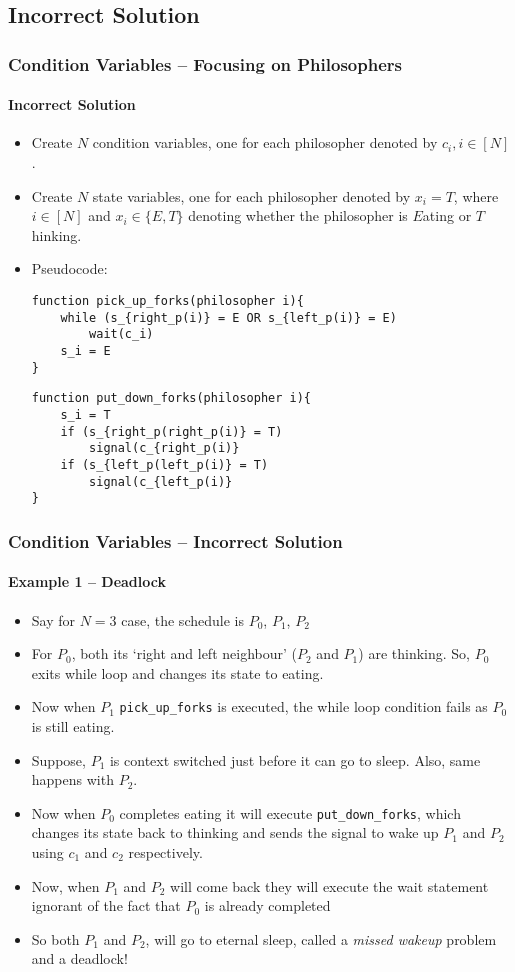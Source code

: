 \documentclass[aspectratio=169, handout, 10pt]{beamer}
\theoremstyle{example}
\begin{document}
\subsection{Incorrect Solution}
\begin{frame}[fragile]\frametitle{Condition Variables -- Focusing on Philosophers}\framesubtitle{Incorrect Solution}
  \small\begin{itemize}
  \pause\item Create $N$ condition variables, one for each philosopher denoted by $c_i, i \in [N]$.
  \pause\item Create $N$ state variables, one for each philosopher denoted by $x_i = T$, where $i \in [N]$ and $x_i \in \{E,T\}$ denoting whether the philosopher is $E$ating or $T$hinking.
  \pause\item Pseudocode:
\begin{Verbatim}[frame=single]
function pick_up_forks(philosopher i){
    while (s_{right_p(i)} = E OR s_{left_p(i)} = E)
        wait(c_i)
    s_i = E
}
\end{Verbatim}
\begin{Verbatim}[frame=single]
function put_down_forks(philosopher i){
    s_i = T
    if (s_{right_p(right_p(i)} = T)
        signal(c_{right_p(i)}
    if (s_{left_p(left_p(i)} = T)
        signal(c_{left_p(i)}
}
\end{Verbatim}
  \end{itemize}
\end{frame}
\begin{frame}[fragile]\frametitle{Condition Variables -- Incorrect Solution}\framesubtitle{Example 1 -- Deadlock}
  \begin{example}
  \begin{itemize}
  \pause\item Say for $N=3$ case, the schedule is $P_0$, $P_1$, $P_2$
  \pause\item For $P_0$, both its `right and left neighbour' ($P_2$ and $P_1$) are thinking. So, $P_0$ exits while loop and changes its state to eating.
  \pause\item Now when $P_1$ \verb!pick_up_forks! is executed, the while loop condition fails as $P_0$ is still eating.
  \pause\item Suppose, $P_1$ is context switched just before it can go to sleep. Also, same happens with $P_2$.
  \pause\item Now when $P_0$ completes eating it will execute \verb!put_down_forks!, which changes its state back to thinking and sends the signal to wake up $P_1$ and $P_2$ using $c_1$ and $c_2$ respectively.
  \pause\item Now, when $P_1$ and $P_2$ will come back they will execute the wait statement ignorant of the fact that $P_0$ is already completed
  \pause\item So both $P_1$ and $P_2$, will go to eternal sleep, called a \emph{missed wakeup} problem and a deadlock!
  \end{itemize}
  \end{example}
\end{frame}
\end{document}
